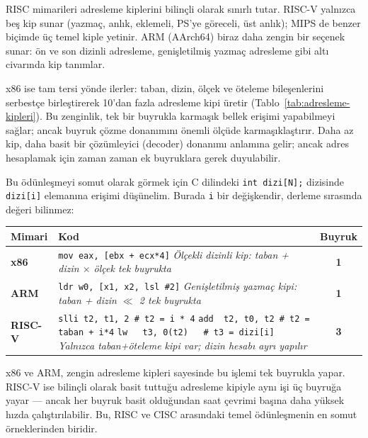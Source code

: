 \begin{karsilastirma}
RISC mimarileri adresleme kiplerini bilinçli olarak sınırlı tutar. RISC-V yalnızca beş kip sunar (yazmaç, anlık, eklemeli, PS'ye göreceli, üst anlık); MIPS de benzer biçimde üç temel kiple yetinir. ARM (AArch64) biraz daha zengin bir seçenek sunar: ön ve son dizinli adresleme, genişletilmiş yazmaç adresleme gibi altı civarında kip tanımlar.

x86 ise tam tersi yönde ilerler: taban, dizin, ölçek ve öteleme bileşenlerini serbestçe birleştirerek 10'dan fazla adresleme kipi üretir (Tablo~\ref{tab:adresleme-kipleri}). Bu zenginlik, tek bir buyrukla karmaşık bellek erişimi yapabilmeyi sağlar; ancak buyruk çözme donanımını önemli ölçüde karmaşıklaştırır. Daha az kip, daha basit bir çözümleyici (decoder) donanımı anlamına gelir; ancak adres hesaplamak için zaman zaman ek buyruklara gerek duyulabilir.

Bu ödünleşmeyi somut olarak görmek için C dilindeki \texttt{int dizi[N];} dizisinde \texttt{dizi[i]} elemanına erişimi düşünelim. Burada \texttt{i} bir değişkendir, derleme sırasında değeri bilinmez:

\begin{center}
\small
\begin{tabular}{lp{9.5cm}c}
\toprule
\textbf{Mimari} & \textbf{Kod} & \textbf{Buyruk} \\
\midrule
\textbf{x86} & \texttt{mov eax, [ebx + ecx*4]} \newline \textit{Ölçekli dizinli kip: taban + dizin $\times$ ölçek tek buyrukta} & \textbf{1} \\
\midrule
\textbf{ARM} & \texttt{ldr w0, [x1, x2, lsl \#2]} \newline \textit{Genişletilmiş yazmaç kipi: taban + dizin $\ll$ 2 tek buyrukta} & \textbf{1} \\
\midrule
\textbf{RISC-V} & \texttt{slli t2, t1, 2 \quad \# t2 = i * 4} \newline \texttt{add ~t2, t0, t2 \quad \# t2 = taban + i*4} \newline \texttt{lw ~~t3, 0(t2) ~~\quad \# t3 = dizi[i]} \newline \textit{Yalnızca taban+öteleme kipi var; dizin hesabı ayrı yapılır} & \textbf{3} \\
\bottomrule
\end{tabular}
\end{center}

x86 ve ARM, zengin adresleme kipleri sayesinde bu işlemi tek buyrukla yapar. RISC-V ise bilinçli olarak basit tuttuğu adresleme kipiyle aynı işi üç buyruğa yayar --- ancak her buyruk basit olduğundan saat çevrimi başına daha yüksek hızda çalıştırılabilir. Bu, RISC ve CISC arasındaki temel ödünleşmenin en somut örneklerinden biridir.
\end{karsilastirma}

